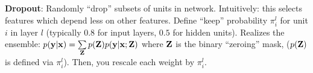     \textbf{Dropout}: Randomly ``drop'' subsets of units in network. Intuitively: this selects features which depend less on other features. Define ``keep'' probability $\pi^l_i$ for unit $i$ in layer $l$ (typically $0.8$ for input layers, $0.5$ for hidden units). Realizes the ensemble: $p(\mathbf y|\mathbf x)=\sum\limits_\mathbf Z p(\mathbf Z)p(\mathbf y|\mathbf x;\mathbf Z)$ where $\mathbf Z$ is the binary ``zeroing'' mask, ($p(\mathbf Z)$ is defined via $\pi^l_i$). Then, you rescale each weight by $\pi^l_i$.
    
    
